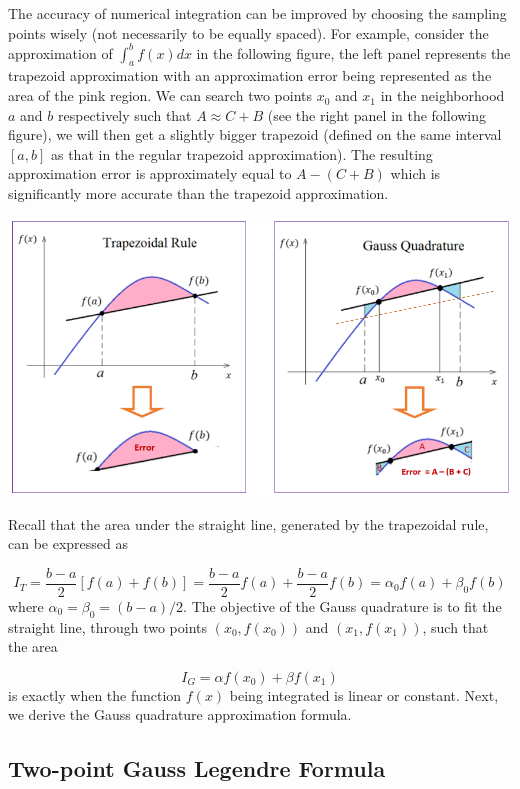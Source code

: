 \documentclass[
]{book}
\begin{document}
The accuracy of numerical integration can be improved by choosing the sampling points wisely (not necessarily to be equally spaced). For example, consider the approximation of \(\int_a^bf(x)dx\) in the following figure, the left panel represents the trapezoid approximation with an approximation error being represented as the area of the pink region. We can search two points \(x_0\) and \(x_1\) in the neighborhood \(a\) and \(b\) respectively such that \(A \approx C + B\) (see the right panel in the following figure), we will then get a slightly bigger trapezoid (defined on the same interval \([a, b]\) as that in the regular trapezoid approximation). The resulting approximation error is approximately equal to \(A - (C + B)\) which is significantly more accurate than the trapezoid approximation.

\begin{center}\includegraphics[width=0.75\linewidth]{img13/w13-GaussQuadratureDemo} \end{center}

Recall that the area under the straight line, generated by the trapezoidal rule, can be expressed as

\[
I_T = \frac{b-a}{2}[f(a) + f(b)] = \frac{b-a}{2}f(a)  + \frac{b-a}{2} f(b) = \alpha_0 f(a) + \beta_0 f(b)
\]
where \(\alpha_0 = \beta_0 = (b-a)/2\). The objective of the Gauss quadrature is to fit the straight line, through two points \((x_0, f(x_0))\) and \((x_1, f(x_1))\), such that the area

\[
I_G = \alpha f(x_0) +\beta f(x_1)
\]
is exactly when the function \(f(x)\) being integrated is linear or constant. Next, we derive the Gauss quadrature approximation formula.

\hfill\break

\hypertarget{two-point-gauss-legendre-formula}{%
\subsection{Two-point Gauss Legendre Formula}\label{two-point-gauss-legendre-formula}}
\end{document}
